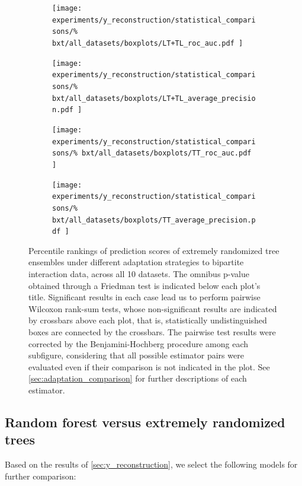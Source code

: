 \begin{figure}[tbh]
    \centering
    \begin{subfigure}{0.49\textwidth}
        \texttt{[image: 
            experiments/y\_reconstruction/statistical\_comparisons/\%
            bxt/all\_datasets/boxplots/LT+TL\_roc\_auc.pdf
        ]}
    \end{subfigure}
    \begin{subfigure}{0.49\textwidth}
        \texttt{[image: 
            experiments/y\_reconstruction/statistical\_comparisons/\%
            bxt/all\_datasets/boxplots/LT+TL\_average\_precision.pdf
        ]}
    \end{subfigure}

    \begin{subfigure}{0.49\textwidth}
        \texttt{[image: 
            experiments/y\_reconstruction/statistical\_comparisons/\%
            bxt/all\_datasets/boxplots/TT\_roc\_auc.pdf
        ]}
    \end{subfigure}
    \begin{subfigure}{0.49\textwidth}
        \texttt{[image: 
            experiments/y\_reconstruction/statistical\_comparisons/\%
            bxt/all\_datasets/boxplots/TT\_average\_precision.pdf
        ]}
    \end{subfigure}
    \caption{
        Percentile rankings of prediction scores of extremely randomized tree ensembles under different adaptation strategies to bipartite interaction data, across all 10 datasets.
        The omnibus p-value obtained through a Friedman test is indicated below each plot's title. Significant results in each case lead us to perform pairwise Wilcoxon rank-sum tests, whose non-significant results are indicated by crossbars above each plot, that is, statistically undistinguished boxes are connected by the crossbars. The pairwise test results were corrected by the Benjamini-Hochberg procedure among each subfigure, considering that all possible estimator pairs were evaluated even if their comparison is not indicated in the plot. See \autoref{sec:adaptation_comparison} for further descriptions of each estimator.
    }
    \label{fig:bxt_y_reconstruction}
\end{figure}

\subsection{Random forest versus extremely randomized trees}

Based on the results of \autoref{sec:y_reconstruction}, we select the following models for further comparison:

